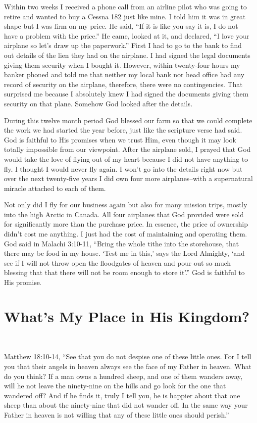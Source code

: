 \documentclass[twoside, 12pt]{book}
\begin{document}
Within two weeks I received a phone call from an airline pilot who was going to retire and wanted to buy a Cessna 182 just like mine. I told him it was in great shape but I was firm on my price. He said, “If it is like you say it is, I do not have a problem with the price.” He came, looked at it, and declared, “I love your airplane so let's draw up the paperwork.” First I had to go to the bank to find out details of the lien they had on the airplane. I had signed the legal documents giving them security when I bought it. However, within twenty-four hours my banker phoned and told me that neither my local bank nor head office had any record of security on the airplane, therefore, there were no contingencies. That surprised me because I absolutely knew I had signed the documents giving them security on that plane. Somehow God looked after the details.

During this twelve month period God blessed our farm so that we could complete the work we had started the year before, just like the scripture verse had said. God is faithful to His promises when we trust Him, even though it may look totally impossible from our viewpoint. After the airplane sold, I prayed that God would take the love of flying out of my heart because I did not have anything to fly. I thought I would never fly again. I won't go into the details right now but over the next twenty-five years I did own four more airplanes--with a supernatural miracle attached to each of them. 

Not only did I fly for our business again but also for many mission trips, mostly into the high Arctic in Canada. All four airplanes that God provided were sold for significantly more than the purchase price. In essence, the price of ownership didn’t cost me anything. I just had the cost of maintaining and operating them. God said in Malachi 3:10-11, “Bring the whole tithe into the storehouse, that there may be food in my house. ‘Test me in this,’ says the Lord Almighty, ‘and see if I will not throw open the floodgates of heaven and pour out so much blessing that that there will not be room enough to store it’.” God is faithful to His promise.


\chapter{What's My Place in His Kingdom?}
\

Matthew 18:10-14, “See that you do not despise one of these little ones. For I tell you that their angels in heaven always see the face of my Father in heaven. What do you think? If a man owns a hundred sheep, and one of them wanders away, will he not leave the ninety-nine on the hills and go look for the one that wandered off? And if he finds it, truly I tell you, he is happier about that one sheep than about the ninety-nine that did not wander off. In the same way your Father in heaven is not willing that any of these little ones should perish.”
\end{document}
